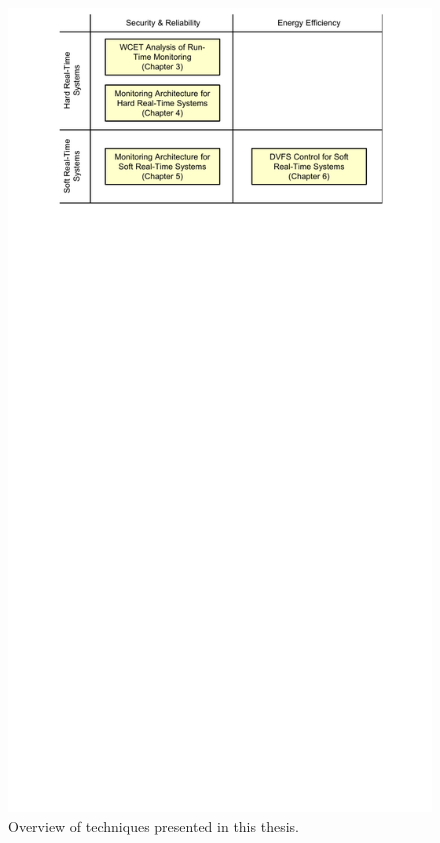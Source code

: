 \begin{figure}
  \begin{center}
    \includegraphics{figs/thesis_overview.pdf}
    \caption{Overview of techniques presented in this thesis.}
    \label{fig:intro.thesis_overview}
  \end{center}
\end{figure}


